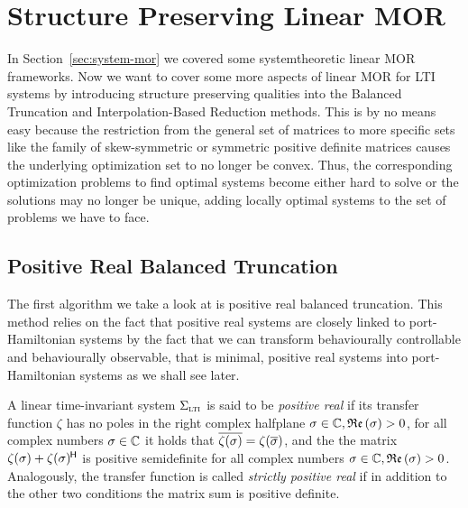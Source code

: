 \section{Structure Preserving Linear MOR}\label{sec:structure-preserving-mor}

In Section~\ref{sec:system-mor} we covered some systemtheoretic linear MOR frameworks.
Now we want to cover some more aspects of linear MOR for LTI systems by introducing structure preserving qualities into the Balanced Truncation and Interpolation-Based Reduction methods.
This is by no means easy because the restriction from the general set of matrices to more specific sets like the family of skew-symmetric or symmetric positive definite matrices causes the underlying optimization set to no longer be convex.
Thus, the corresponding optimization problems to find optimal systems become either hard to solve or the solutions may no longer be unique, adding locally optimal systems to the set of problems we have to face.

\subsection{Positive Real Balanced Truncation}\label{subsec:prbt}

The first algorithm we take a look at is positive real balanced truncation.
This method relies on the fact that positive real systems are closely linked to port-Hamiltonian systems by the fact that we can transform behaviourally controllable and behaviourally observable, that is minimal, positive real systems into port-Hamiltonian systems as we shall see later.

\begin{definition}\label{def:positive-real}
    A linear time-invariant system $\Sigma_{\textnormal{\scshape lti}}$ is said to be \emph{positive real} if its transfer function $\zeta$ has no poles in the right complex halfplane $\sigma \in \mathbb{C}, \mathop{}\!\mathfrak{Re}\left(\sigma\right) > 0$, for all complex numbers $\sigma \in \mathbb{C}$ it holds that $\overline{\zeta(\sigma)} = \zeta(\overline{\sigma})$, and the the matrix $\zeta(\sigma) + \zeta(\sigma)^{\mkern-1.5mu \mathsf{H}}$ is positive semidefinite for all complex numbers $\sigma \in \mathbb{C}, \mathop{}\!\mathfrak{Re}\left(\sigma\right) > 0$.
    Analogously, the transfer function is called \emph{strictly positive real} if in addition to the other two conditions the matrix sum is positive definite.
\end{definition}

